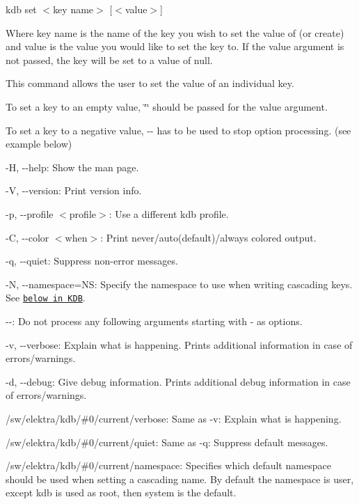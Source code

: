 {\ttfamily kdb set $<$key name$>$ \mbox{[}$<$value$>$\mbox{]}}

Where {\ttfamily key name} is the name of the key you wish to set the value of (or create) and {\ttfamily value} is the value you would like to set the key to. If the {\ttfamily value} argument is not passed, the key will be set to a value of {\ttfamily null}.

This command allows the user to set the value of an individual key.

To set a key to an empty value, {\ttfamily \char`\"{}\char`\"{}} should be passed for the {\ttfamily value} argument.

To set a key to a negative value, {\ttfamily -\/-\/} has to be used to stop option processing. (see example below)


\begin{DoxyItemize}
\item {\ttfamily -\/H}, {\ttfamily -\/-\/help}\+: Show the man page.
\item {\ttfamily -\/V}, {\ttfamily -\/-\/version}\+: Print version info.
\item {\ttfamily -\/p}, {\ttfamily -\/-\/profile $<$profile$>$}\+: Use a different kdb profile.
\item {\ttfamily -\/C}, {\ttfamily -\/-\/color $<$when$>$}\+: Print never/auto(default)/always colored output.
\item {\ttfamily -\/q}, {\ttfamily -\/-\/quiet}\+: Suppress non-\/error messages.
\item {\ttfamily -\/N}, {\ttfamily -\/-\/namespace=NS}\+: Specify the namespace to use when writing cascading keys. See \href{#KDB}{\tt below in K\+DB}.
\item {\ttfamily -\/-\/}\+: Do not process any following arguments starting with {\ttfamily -\/} as options.
\item {\ttfamily -\/v}, {\ttfamily -\/-\/verbose}\+: Explain what is happening. Prints additional information in case of errors/warnings.
\item {\ttfamily -\/d}, {\ttfamily -\/-\/debug}\+: Give debug information. Prints additional debug information in case of errors/warnings.
\end{DoxyItemize}


\begin{DoxyItemize}
\item {\ttfamily /sw/elektra/kdb/\#0/current/verbose}\+: Same as {\ttfamily -\/v}\+: Explain what is happening.
\item {\ttfamily /sw/elektra/kdb/\#0/current/quiet}\+: Same as {\ttfamily -\/q}\+: Suppress default messages.
\item {\ttfamily /sw/elektra/kdb/\#0/current/namespace}\+: Specifies which default namespace should be used when setting a cascading name. By default the namespace is user, except {\ttfamily kdb} is used as root, then {\ttfamily system} is the default.
\end{DoxyItemize}

